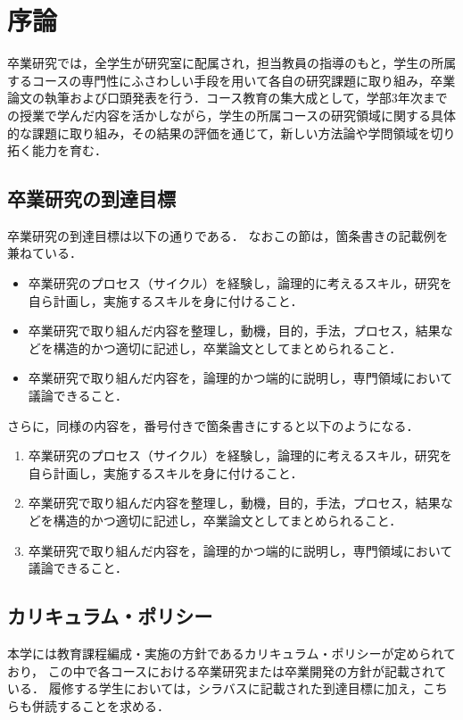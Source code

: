 \chapter{序論}	%

卒業研究では，全学生が研究室に配属され，担当教員の指導のもと，学生の所属するコースの専門性にふさわしい手段を用いて各自の研究課題に取り組み，卒業論文の執筆および口頭発表を行う．コース教育の集大成として，学部3年次までの授業で学んだ内容を活かしながら，学生の所属コースの研究領域に関する具体的な課題に取り組み，その結果の評価を通じて，新しい方法論や学問領域を切り拓く能力を育む．

\section{卒業研究の到達目標}
卒業研究の到達目標は以下の通りである．
なおこの節は，箇条書きの記載例を兼ねている．
\begin{itemize}
\item 卒業研究のプロセス（サイクル）を経験し，論理的に考えるスキル，研究を自ら計画し，実施するスキルを身に付けること．
\item 卒業研究で取り組んだ内容を整理し，動機，目的，手法，プロセス，結果などを構造的かつ適切に記述し，卒業論文としてまとめられること．
\item 卒業研究で取り組んだ内容を，論理的かつ端的に説明し，専門領域において議論できること．
\end{itemize}

さらに，同様の内容を，番号付きで箇条書きにすると以下のようになる．
\begin{enumerate}
\item 卒業研究のプロセス（サイクル）を経験し，論理的に考えるスキル，研究を自ら計画し，実施するスキルを身に付けること．
\item 卒業研究で取り組んだ内容を整理し，動機，目的，手法，プロセス，結果などを構造的かつ適切に記述し，卒業論文としてまとめられること．
\item 卒業研究で取り組んだ内容を，論理的かつ端的に説明し，専門領域において議論できること．
\end{enumerate}

\section{カリキュラム・ポリシー}
本学には教育課程編成・実施の方針であるカリキュラム・ポリシーが定められており，
この中で各コースにおける卒業研究または卒業開発の方針が記載されている．
履修する学生においては，シラバスに記載された到達目標に加え，こちらも併読することを求める．


